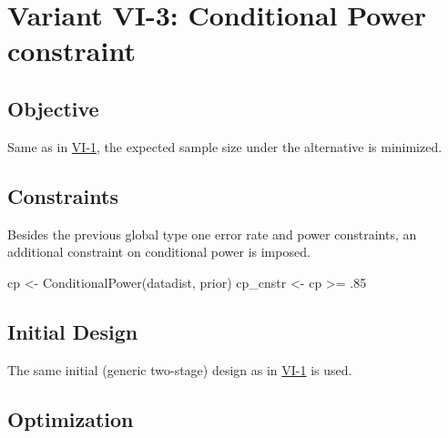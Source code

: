 \documentclass[
]{book}
\newenvironment{Shaded}{\begin{snugshade}}{\end{snugshade}}
\newcommand{\DecValTok}[1]{\textcolor[rgb]{0.00,0.00,0.81}{#1}}
\newcommand{\FunctionTok}[1]{\textcolor[rgb]{0.00,0.00,0.00}{#1}}
\newcommand{\NormalTok}[1]{#1}
\newcommand{\OtherTok}[1]{\textcolor[rgb]{0.56,0.35,0.01}{#1}}
\newcommand{\SpecialCharTok}[1]{\textcolor[rgb]{0.00,0.00,0.00}{#1}}
\begin{document}
\hypertarget{variant-vi-3-conditional-power-constraint}{%
\section{Variant VI-3: Conditional Power constraint}\label{variant-vi-3-conditional-power-constraint}}

\hypertarget{objective-16}{%
\subsection{Objective}\label{objective-16}}

Same as in \protect\hyperlink{variantVI_1}{VI-1}, the expected sample size under the alternative is minimized.

\hypertarget{constraints-16}{%
\subsection{Constraints}\label{constraints-16}}

Besides the previous global type one error rate and power constraints, an additional constraint on conditional power is imposed.

\begin{Shaded}
\begin{Highlighting}[]
\NormalTok{cp       }\OtherTok{\textless{}{-}} \FunctionTok{ConditionalPower}\NormalTok{(datadist, prior)}
\NormalTok{cp\_cnstr }\OtherTok{\textless{}{-}}\NormalTok{ cp }\SpecialCharTok{\textgreater{}=}\NormalTok{ .}\DecValTok{85}
\end{Highlighting}
\end{Shaded}

\hypertarget{initial-design-13}{%
\subsection{Initial Design}\label{initial-design-13}}

The same initial (generic two-stage) design as in \protect\hyperlink{variantVI_1}{VI-1} is used.

\hypertarget{optimization-15}{%
\subsection{Optimization}\label{optimization-15}}
\end{document}
